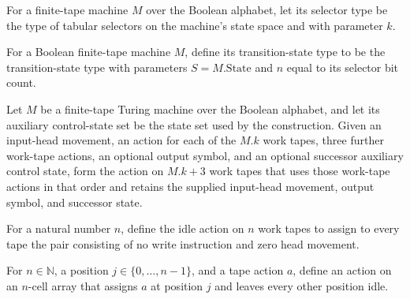 \begin{definition}
\label{Complexity.Meyer.Sel}
\leanok
{}
For a finite-tape machine $M$ over the Boolean alphabet, let its selector type be the
type of tabular selectors on the machine’s state space and with parameter $k$.
\end{definition}

\begin{definition}
\label{Complexity.Meyer.St}
\leanok
{}
For a Boolean finite-tape machine $M$, define its transition-state type to be the
transition-state type with parameters $S=M.\mathrm{State}$ and $n$ equal to its selector
bit count.
\end{definition}

\begin{definition}
\label{Complexity.Meyer.tact}
\leanok
{}
Let $M$ be a finite-tape Turing machine over the Boolean alphabet, and let its auxiliary
control-state set be the state set used by the construction. Given an input-head
movement, an action for each of the $M.k$ work tapes, three further work-tape actions,
an optional output symbol, and an optional successor auxiliary control state, form the
action on $M.k+3$ work tapes that uses those work-tape actions in that order and retains
the supplied input-head movement, output symbol, and successor state.
\end{definition}

\begin{definition}
\label{Complexity.Meyer.idle}
\leanok
For a natural number $n$, define the idle action on $n$ work tapes to assign to every
tape the pair consisting of no write instruction and zero head movement.
\end{definition}

\begin{definition}
\label{Complexity.Meyer.one}
\leanok
{}
For $n\in\mathbb{N}$, a position $j\in\{0,\ldots,n-1\}$, and a tape action $a$, define
an action on an $n$-cell array that assigns $a$ at position $j$ and leaves every other
position idle.
\end{definition}

